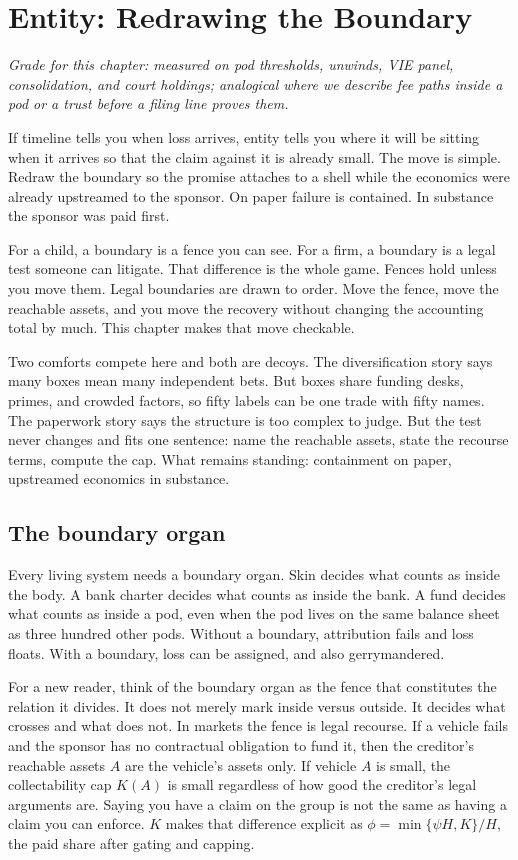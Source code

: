 \chapter{Entity: Redrawing the Boundary}
\label{ch:entity}

\textit{Grade for this chapter: measured on pod thresholds, unwinds, VIE panel, consolidation, and court holdings; analogical where we describe fee paths inside a pod or a trust before a filing line proves them.}

If timeline tells you when loss arrives, entity tells you where it will be sitting when it arrives so that the claim against it is already small. The move is simple. Redraw the boundary so the promise attaches to a shell while the economics were already upstreamed to the sponsor. On paper failure is contained. In substance the sponsor was paid first.

For a child, a boundary is a fence you can see. For a firm, a boundary is a legal test someone can litigate. That difference is the whole game. Fences hold unless you move them. Legal boundaries are drawn to order. Move the fence, move the reachable assets, and you move the recovery without changing the accounting total by much. This chapter makes that move checkable.

Two comforts compete here and both are decoys. The diversification story says many boxes mean many independent bets. But boxes share funding desks, primes, and crowded factors, so fifty labels can be one trade with fifty names. The paperwork story says the structure is too complex to judge. But the test never changes and fits one sentence: name the reachable assets, state the recourse terms, compute the cap. What remains standing: containment on paper, upstreamed economics in substance.

\section{The boundary organ}

Every living system needs a boundary organ. Skin decides what counts as inside the body. A bank charter decides what counts as inside the bank. A fund decides what counts as inside a pod, even when the pod lives on the same balance sheet as three hundred other pods. Without a boundary, attribution fails and loss floats. With a boundary, loss can be assigned, and also gerrymandered.

For a new reader, think of the boundary organ as the fence that constitutes the relation it divides. It does not merely mark inside versus outside. It decides what crosses and what does not. In markets the fence is legal recourse. If a vehicle fails and the sponsor has no contractual obligation to fund it, then the creditor's reachable assets $A$ are the vehicle's assets only. If vehicle $A$ is small, the collectability cap $K(A)$ is small regardless of how good the creditor's legal arguments are. Saying you have a claim on the group is not the same as having a claim you can enforce. $K$ makes that difference explicit as $\phi = \min\{\psi H, K\}/H$, the paid share after gating and capping.

